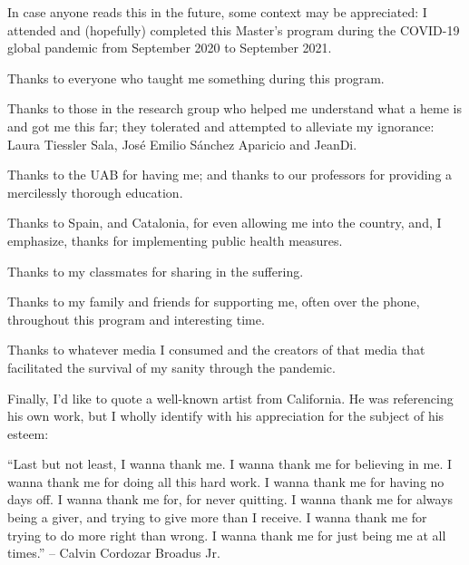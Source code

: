 \documentclass[a4paper, nobind]{templates/ociamthesis}
\begin{document}
\begin{romanpages}

\maketitle


\begin{acknowledgements}
 	In case anyone reads this in the future, some context may be appreciated: I attended and (hopefully) completed this Master's program during the COVID-19 global pandemic from September 2020 to September 2021.

  Thanks to everyone who taught me something during this program.

  Thanks to those in the research group who helped me understand what a heme is and got me this far; they tolerated and attempted to alleviate my ignorance: Laura Tiessler Sala, José Emilio Sánchez Aparicio and JeanDi.

  Thanks to the UAB for having me; and thanks to our professors for providing a mercilessly thorough education.

  Thanks to Spain, and Catalonia, for even allowing me into the country, and, I emphasize, thanks for implementing public health measures.

  Thanks to my classmates for sharing in the suffering.

  Thanks to my family and friends for supporting me, often over the phone, throughout this program and interesting time.

  Thanks to whatever media I consumed and the creators of that media that facilitated the survival of my sanity through the pandemic.

  Finally, I'd like to quote a well-known artist from California. He was referencing his own work, but I wholly identify with his appreciation for the subject of his esteem:

  ``Last but not least, I wanna thank me. I wanna thank me for believing in me. I wanna thank me for doing all this hard work. I wanna thank me for having no days off. I wanna thank me for, for never quitting. I wanna thank me for always being a giver, and trying to give more than I receive. I wanna thank me for trying to do more right than wrong. I wanna thank me for just being me at all times.''
  -- Calvin Cordozar Broadus Jr.
\end{acknowledgements}



\end{romanpages}
\end{document}
